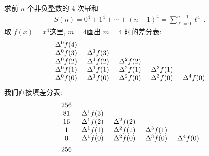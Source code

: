 \begin{example}
    求前 $n$ 个非负整数的 $4$ 次幂和
    \begin{align*}
        S(n) = 0^4 + 1^4 + \cdots + (n-1)^4 = \sum_{\ell = 0}^{n - 1} \ell^4 \period
    \end{align*}
    取 $f(x) = x^4$\period 这里, $m = 4$\period 画出 $m = 4$ 时的差分表:
    \begin{align*}
        \arraycolsep=0.25cm
        \begin{array}{ccccc}
            \Delta^{0} f(4) & \               & \               & \               & \               \\
            \Delta^{0} f(3) & \Delta^{1} f(3) & \               & \               & \               \\
            \Delta^{0} f(2) & \Delta^{1} f(2) & \Delta^{2} f(2) & \               & \               \\
            \Delta^{0} f(1) & \Delta^{1} f(1) & \Delta^{2} f(1) & \Delta^{3} f(1) & \               \\
            \Delta^{0} f(0) & \Delta^{1} f(0) & \Delta^{2} f(0) & \Delta^{3} f(0) & \Delta^{4} f(0) \\
        \end{array}
    \end{align*}
    我们直接填差分表:
    \begin{align*}
         & {
                \arraycolsep=0.25cm
                \begin{array}{ccccc}
                    256 & \               & \               & \               & \               \\
                    81  & \Delta^{1} f(3) & \               & \               & \               \\
                    16  & \Delta^{1} f(2) & \Delta^{2} f(2) & \               & \               \\
                    1   & \Delta^{1} f(1) & \Delta^{2} f(1) & \Delta^{3} f(1) & \               \\
                    0   & \Delta^{1} f(0) & \Delta^{2} f(0) & \Delta^{3} f(0) & \Delta^{4} f(0) \\
                \end{array}
        }    \\
         & {
                \arraycolsep=0.25cm
                \begin{array}{ccccc}
                    256 & \   & \               & \               & \               \\

\end{array}}
\end{align*}
\end{example}
